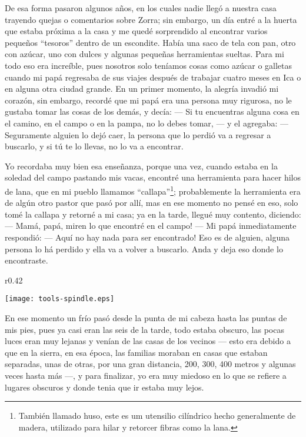 De esa forma pasaron algunos años, en los cuales nadie llegó a nuestra casa trayendo quejas o comentarios sobre Zorra; sin embargo, un día entré a la huerta que estaba próxima a la casa y me quedé sorprendido al encontrar varios pequeños ``tesoros'' dentro de un escondite. Había una saco de tela con pan, otro con azúcar, uno con dulces y algunas pequeñas herramientas sueltas.
Para mi todo eso era increíble, pues nosotros solo teníamos cosas como azúcar o galletas cuando mi papá regresaba de sus viajes después de trabajar cuatro meses en Ica o en alguna otra ciudad grande. 
En un primer momento, la alegría invadió mi corazón, sin embargo, recordé que mi papá era una persona muy rigurosa, no le gustaba tomar las cosas de los demás, y decía: 
--- Si tu encuentras alguna cosa en el camino, en el campo o en la pampa, no lo debes tomar, --- 
y el agregaba: 
--- Seguramente alguien lo dejó caer, la persona que lo perdió va a regresar a buscarlo, y si tú te lo llevas, no lo va a encontrar.

Yo recordaba muy bien esa enseñanza, porque una vez, cuando estaba en la soledad del campo pastando mis vacas, encontré una herramienta para hacer hilos de lana, que en mi pueblo llamamos ``callapa''\footnote{También llamado huso, este es um utensilio cilíndrico hecho generalmente de madera, utilizado para hilar y retorcer fibras como la lana.}; probablemente la herramienta era de algún otro pastor que pasó por allí, mas en ese momento no pensé en eso, solo tomé la callapa y retorné a mi casa; ya en la tarde, llegué muy contento, diciendo: 
--- Mamá, papá, miren lo que encontré en el campo! ---
Mi papá inmediatamente respondió:  
--- Aquí no hay nada para ser encontrado! Eso es de alguien, alguna persona lo há perdido y ella va a volver a buscarlo. Anda y deja eso donde lo encontraste.

\begin{wrapfigure}{r}{0.42\textwidth}
  \begin{center}
  \vspace{-10pt}
    \texttt{[image: tools-spindle.eps]}
  \end{center}
  \vspace{-20pt}
\end{wrapfigure}
En ese momento un frío pasó desde la punta de mi cabeza hasta las puntas de mis pies, pues ya casi eran las seis de la tarde, todo estaba obscuro, las pocas luces eran muy lejanas y venían de las casas de los vecinos --- esto era debido a que en la sierra, en esa época, las familias moraban en casas que estaban separadas, unas de otras, por una gran distancia, 200, 300, 400 metros y algunas veces hasta más ---, y para finalizar, yo era muy miedoso en lo que se refiere a lugares obscuros y donde tenia que ir estaba muy lejos.

